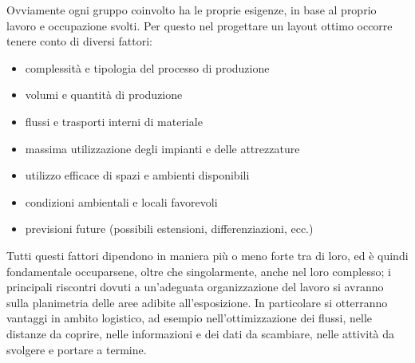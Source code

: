 \documentclass[12pt,a4paper,openright,twoside]{report}
\begin{document}
Ovviamente ogni gruppo coinvolto ha le proprie esigenze, in base al proprio lavoro e occupazione svolti. Per questo nel progettare un layout ottimo occorre tenere conto di diversi fattori:
\begin{itemize}
\item complessit\`{a} e tipologia del processo di produzione
\item volumi e quantit\`{a} di produzione
\item flussi e trasporti interni di materiale
\item massima utilizzazione degli impianti e delle attrezzature
\item utilizzo efficace di spazi e ambienti disponibili
\item condizioni ambientali e locali favorevoli
\item previsioni future (possibili estensioni, differenziazioni, ecc.)
\end{itemize} 
Tutti questi fattori dipendono in maniera pi\`{u} o meno forte tra di loro, ed \`{e} quindi fondamentale occuparsene, oltre che singolarmente, anche nel loro complesso; i principali riscontri dovuti a un'adeguata organizzazione del lavoro si avranno sulla planimetria delle aree adibite all'esposizione. In particolare si otterranno vantaggi in ambito logistico, ad esempio nell'ottimizzazione dei flussi, nelle distanze da coprire, nelle informazioni e dei dati da scambiare, nelle attivit\`{a} da svolgere e portare a termine.
\end{document}
